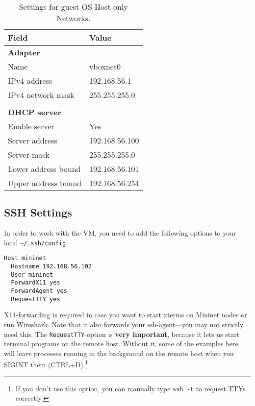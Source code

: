 \begin{table}[H]
  \centering
  \begin{tabular}{ll}
    \hline \textbf{Field} & \textbf{Value} \\
    \hline
      \textbf{Adapter} & \\
      Name & vboxnet0 \\
      IPv4 address & 192.168.56.1 \\
      IPv4 network mask & 255.255.255.0 \\
       & \\
      \textbf{DHCP server} & \\
      Enable server & Yes \\
      Server address & 192.168.56.100 \\
      Server mask & 255.255.255.0 \\
      Lower address bound & 192.168.56.101 \\
      Upper address bound & 192.168.56.254 \\
    \hline
  \end{tabular}
  \caption{Settings for guest OS Host-only Networks.}
  \label{table:hostonlynetworks.settings}
\end{table}

\subsection{SSH Settings}
\label{chapter:ssh.setup}

In order to work with the VM, you need to add the following options to your
local \texttt{\~{}/.ssh/config}

\begin{verbatim}
Host mininet
  Hostname 192.168.56.102
  User mininet
  ForwardX11 yes
  ForwardAgent yes
  RequestTTY yes
\end{verbatim}

X11-forwarding is required in case you
want to start xterms on Mininet
nodes or run Wireshark.  Note that it also forwards your
ssh-agent---you may not strictly need this.  The \texttt{RequestTTY}-option
is \textbf{very important}, because it lets us start terminal programs on the remote
host. Without it, some of the examples here will leave processes running in
the background on the remote host when you SIGINT them (CTRL+D).\footnote{If
you don't use this option, you can manually type \texttt{ssh -t} to request
TTYs correctly.}

